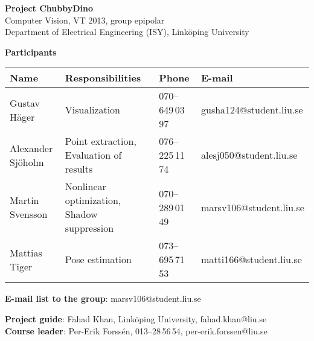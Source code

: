 \begin{center}
    \vspace*{4\baselineskip}

	\textbf{\huge Project ChubbyDino} \\
	\vspace*{0.5\baselineskip}
	Computer Vision, VT 2013, group epipolar \\
	Department of Electrical Engineering (ISY), Link\"{o}ping University
	
	\vspace*{2\baselineskip}
	\textbf{\LARGE Participants}


	{\footnotesize 
	\begin{tabular}{|p{2.7cm}|p{5cm}|p{2cm}|p{3.4cm}|}
		\hline
			\textbf{Name} & \textbf{Responsibilities} & \textbf{Phone} & \textbf{E-mail} \\
		\hline
		Gustav Häger & Visualization & 070--649\,03\,97 & gusha124@student.liu.se \\
		\hline
		Alexander Sjöholm & Point extraction, \newline Evaluation of results & 076--225\,11\,74 & alesj050@student.liu.se \\
		\hline
		Martin Svensson & Nonlinear optimization, \newline Shadow suppression & 070--289\,01\,49 & marsv106@student.liu.se \\
		\hline
		Mattias Tiger & Pose estimation & 073--695\,71\,53 & matti166@student.liu.se \\
		\hline
	\end{tabular}
	}

{\footnotesize 
\textbf{E-mail list to the group}: marsv106@student.liu.se \\
\vspace{1\baselineskip}

\textbf{Project guide}: Fahad Khan, Link\"{o}ping University, fahad.khan@liu.se \\
\textbf{Course leader}: Per-Erik Forssén, 013--28\,56\,54, per-erik.forssen@liu.se \\
}

\end{center}
